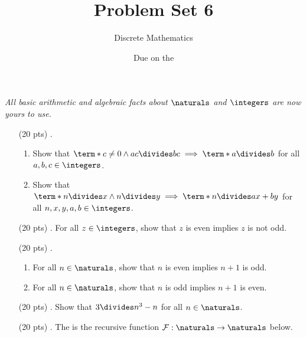 




\title{Problem Set 6}
\author[Daniel Gonzalez Cedre]{Discrete Mathematics}
\date{Due on the }



\maketitle

\emph{All basic arithmetic and algebraic facts about $\naturals$ and $\integers$ are now yours to use.}


\begin{enumerate}
  \item[(20 pts) \quad 1.]
    \begin{enumerate}
      \item
        Show that $\term*{c \neq 0 \land ac \divides bc} \implies \term*{a \divides b}$ for all $a, b, c \in \integers$.
      \item
        Show that $\term*{n \divides x \land n \divides y} \implies \term*{n \divides ax + by}$ for all $n, x, y, a, b \in \integers$.
    \end{enumerate}
  \item[(20 pts) \quad 2.]
    For all $z \in \integers$, show that $z$ is even implies $z$ is not odd.
  \item[(20 pts) \quad 3.]
    \begin{enumerate}
      \item
        For all $n \in \naturals$, show that $n$ is even implies $n + 1$ is odd.
      \item
        For all $n \in \naturals$, show that $n$ is odd implies $n + 1$ is even.
    \end{enumerate}
  \item[(20 pts) \quad 4.]
    Show that $3 \divides n^3 - n$ for all $n \in \naturals$.%
  \item[(20 pts) \quad 5.]
    The  is the recursive function $\mathcal{F}: \naturals \to \naturals$ below.

\end{enumerate}

